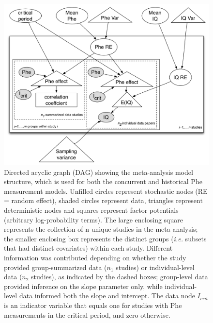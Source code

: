\documentclass{svjour3}                     %
\begin{document}
\begin{figure}[p]


    \includegraphics[width=\textwidth]{model.pdf}

    \caption{Directed acyclic graph (DAG) showing the meta-analysis model structure, which is used for both the concurrent and historical Phe measurement models. Unfilled circles represent stochastic nodes (RE = random effect), shaded circles represent data, triangles represent deterministic nodes and squares represent factor potentials (arbitrary log-probability terms). The large enclosing square represents the collection of n unique studies in the meta-analysis; the smaller enclosing box represents the distinct groups (\emph{i.e.} subsets that had distinct covariates) within each study. Different information was contributed depending on whether the study provided group-summarized data ($n_1$ studies) or individual-level data ($n_2$ studies), as indicated by the dashed boxes; group-level data provided inference on the slope parameter only, while individual-level data informed both the slope and intercept. The data node $I_{crit}$ is an indicator variable that equals one for studies with Phe measurements in the critical period, and zero otherwise.} \label{fig:model}

\end{figure}
\end{document}
